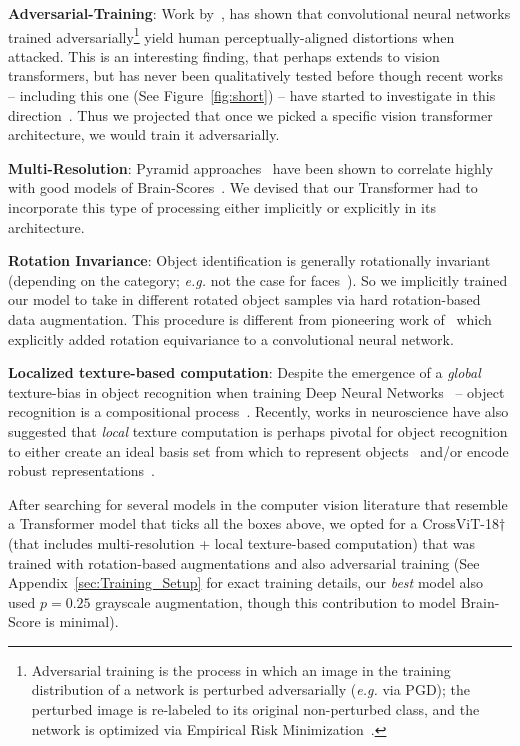\documentclass{article} %
\begin{document}
\textbf{Adversarial-Training}: Work by~\cite{santurkar2019image,engstrom2019adversarial,dapello2020simulating}, has shown that convolutional neural networks trained adversarially\footnote{Adversarial training is the process in which an image in the training distribution of a network is perturbed adversarially (\textit{e.g.} via PGD); the perturbed image is re-labeled to its original non-perturbed class, and the network is optimized via Empirical Risk Minimization~\citep{madry2018towards}.} yield human perceptually-aligned distortions when attacked. This is an interesting finding, that perhaps extends to vision transformers, but has never been qualitatively tested before though recent works -- including this one (See Figure~\ref{fig:short}) -- have started to investigate in this direction~\citep{tuli2021convolutional,caro2020local}. Thus we projected that once we picked a specific vision transformer architecture, we would train it adversarially.

\textbf{Multi-Resolution}: Pyramid approaches~\citep{burt1987laplacian,simoncelli1995steerable,heeger1995pyramid} have been shown to correlate highly with good models of Brain-Scores~\citep{marques2021multi}. We devised that our Transformer had to incorporate this type of processing either implicitly or explicitly in its architecture.

\textbf{Rotation Invariance}: Object identification is generally rotationally invariant (depending on the category; \textit{e.g.} not the case for faces~\citep{kanwisher1998effect}). So we implicitly trained our model to take in different rotated object samples via hard rotation-based data augmentation. This procedure is different from pioneering work of~\cite{ecker2018a} which explicitly added rotation equivariance to a convolutional neural network.

\textbf{Localized texture-based computation}: Despite the emergence of a \textit{global} texture-bias in object recognition when training Deep Neural Networks~\citep{geirhos2018imagenettrained} -- object recognition is a compositional process~\citep{brendel2019approximating,deza2020hierarchically}. Recently, works in neuroscience have also suggested that \textit{local} texture computation is perhaps pivotal for object recognition to either create an ideal basis set from which to represent objects~\citep{long2018mid,jagadeesh2022texture} and/or encode robust representations~\citep{harrington2022finding}.


After searching for several models in the computer vision literature that resemble a Transformer model that ticks all the boxes above, we opted for a CrossViT-18$\dagger$ (that includes multi-resolution + local texture-based computation) that was trained with rotation-based augmentations and also adversarial training (See Appendix~\ref{sec:Training_Setup} for exact training details, our \textit{best} model also used $p=0.25$ grayscale augmentation, though this contribution to model Brain-Score is minimal). 
\end{document}
